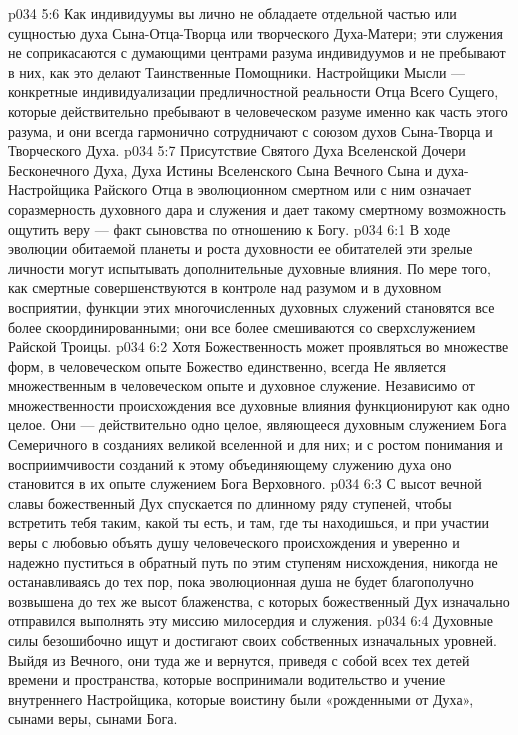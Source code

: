 \vs p034 5:6 \pc Как индивидуумы вы лично не обладаете отдельной частью или сущностью духа Сына\hyp{}Отца\hyp{}Творца или творческого Духа\hyp{}Матери; эти служения не соприкасаются с думающими центрами разума индивидуумов и не пребывают в них, как это делают Таинственные Помощники. Настройщики Мысли --- конкретные индивидуализации предличностной реальности Отца Всего Сущего, которые действительно пребывают в человеческом разуме именно как часть этого разума, и они всегда гармонично сотрудничают с союзом духов Сына\hyp{}Творца и Творческого Духа.
\vs p034 5:7 Присутствие Святого Духа Вселенской Дочери Бесконечного Духа, Духа Истины Вселенского Сына Вечного Сына и духа\hyp{}Настройщика Райского Отца в эволюционном смертном или с ним означает соразмерность духовного дара и служения и дает такому смертному возможность ощутить веру --- факт сыновства по отношению к Богу.
\vs p034 6:1 В ходе эволюции обитаемой планеты и роста духовности ее обитателей эти зрелые личности могут испытывать дополнительные духовные влияния. По мере того, как смертные совершенствуются в контроле над разумом и в духовном восприятии, функции этих многочисленных духовных служений становятся все более скоординированными; они все более смешиваются со сверхслужением Райской Троицы.
\vs p034 6:2 Хотя Божественность может проявляться во множестве форм, в человеческом опыте Божество единственно, всегда  Не является множественным в человеческом опыте и духовное служение. Независимо от множественности происхождения все духовные влияния функционируют как одно целое. Они --- действительно одно целое, являющееся духовным служением Бога Семеричного в созданиях великой вселенной и для них; и с ростом понимания и восприимчивости созданий к этому объединяющему служению духа оно становится в их опыте служением Бога Верховного.
\vs p034 6:3 \pc С высот вечной славы божественный Дух спускается по длинному ряду ступеней, чтобы встретить тебя таким, какой ты есть, и там, где ты находишься, и при участии веры с любовью объять душу человеческого происхождения и уверенно и надежно пуститься в обратный путь по этим ступеням нисхождения, никогда не останавливаясь до тех пор, пока эволюционная душа не будет благополучно возвышена до тех же высот блаженства, с которых божественный Дух изначально отправился выполнять эту миссию милосердия и служения.
\vs p034 6:4 Духовные силы безошибочно ищут и достигают своих собственных изначальных уровней. Выйдя из Вечного, они туда же и вернутся, приведя с собой всех тех детей времени и пространства, которые воспринимали водительство и учение внутреннего Настройщика, которые воистину были «рожденными от Духа», сынами веры, сынами Бога.
